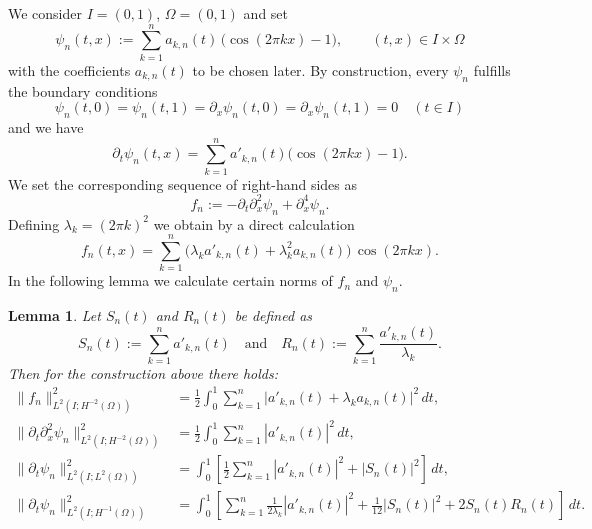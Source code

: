\documentclass{m2an}
\newcommand{\1}{\mathds{1}}
\newtheorem{lemma}[theorem]{Lemma}
\theoremstyle{definition}
\begin{document}
We consider $I=(0,1)$, $\Omega=(0,1)$ and set
\begin{equation}\label{eq:def_psi_n}
\psi_n(t,x) := \sum_{k=1}^n a_{k,n}(t)\,\big(\cos(2\pi k x)-1\big),\qquad (t,x)\in I\times\Omega
\end{equation}
with the coefficients $a_{k,n}(t)$ to be chosen later. By construction, every $\psi_n$ fulfills the boundary conditions
\[
 \psi_n(t,0)=\psi_n(t,1)=\partial_x\psi_n(t,0)=\partial_x\psi_n(t,1)=0\quad (t\in I)
\]
and we have
\[
\partial_t\psi_n(t,x) = \sum_{k=1}^n a'_{k,n}(t)\big(\cos(2\pi k x)-1\big).
\]
We set the corresponding sequence of right-hand sides as
\begin{equation}\label{eq:app_def_fn}
f_n := -\partial_t\partial_x^2\psi_n + \partial_x^4\psi_n.
\end{equation}
Defining $\lambda_k = (2\pi k)^2$ we obtain by a direct calculation
\[
	f_n(t,x)=\sum_{k=1}^n \big(\lambda_k a'_{k,n}(t)+\lambda_k^2 a_{k,n}(t)\big)\,\cos(2\pi k x).
\]
In the following lemma we calculate certain norms of $f_n$ and $\psi_n$.
\begin{lemma}
Let $S_n(t)$ and $R_n(t)$ be defined as
\begin{equation}\label{eq:def:S_n_R_n}
S_n(t):=\sum_{k=1}^n a'_{k,n}(t) \quad \text{and} \quad R_n(t):=\sum_{k=1}^n \frac{a'_{k,n}(t)}{\lambda_k}.
\end{equation}
Then for the construction above there holds:
\begin{subequations}
\begin{align}
    \|f_n\|^2_{L^2(I;H^{-2}(\Omega))} &= \frac12\int_0^1 \sum_{k=1}^n \big|a'_{k,n}(t)+\lambda_k a_{k,n}(t)\big|^2\,dt,\label{eq:app_repr_1}\\
    \|\partial_t \partial^2_x \psi_n\|^2_{L^2(I;H^{-2}(\Omega))} &= \frac12\int_0^1 \sum_{k=1}^n |a'_{k,n}(t)|^2\,dt, \label{eq:app_repr_2}\\
    \|\partial_t \psi_n\|^2_{L^2(I;L^2(\Omega))} &= \int_0^1\left[\frac12\sum_{k=1}^n |a'_{k,n}(t)|^2 + |S_n(t)|^2\right]\,dt, \label{eq:app_repr_3}\\
    \|\partial_t \psi_n\|^2_{L^2(I;H^{-1}(\Omega))} &= \int_0^1\left[\sum_{k=1}^n \frac{1}{2\lambda_k}|a'_{k,n}(t)|^2 + \frac{1}{12}|S_n(t)|^2+2S_n(t)R_n(t)\right] \,dt. \label{eq:app_repr_4}
\end{align}
\end{subequations}
\end{lemma}
\end{document}

